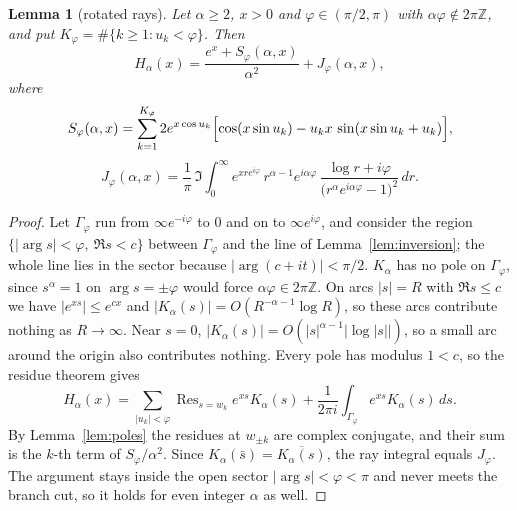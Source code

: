 \documentclass[11pt,a4paper]{article}
\theoremstyle{plain}
\newtheorem{lemma}[theorem]{Lemma}
\theoremstyle{remark}
\newcommand{\Z}{\mathbb Z}
\DeclareMathOperator{\Res}{Res}
\begin{document}
\begin{lemma}[rotated rays]\label{lem:rays}
Let $\alpha\ge2$, $x>0$ and $\varphi\in(\pi/2,\pi)$ with $\alpha\varphi\notin2\pi\Z$, and put
$K_\varphi=\#\{k\ge1:u_k<\varphi\}$. Then
\begin{equation}\label{eq:rays}
 H_\alpha(x)=\frac{e^x+S_\varphi(\alpha,x)}{\alpha^2}+J_\varphi(\alpha,x),
\end{equation}
where
\[
 S_\varphi(\alpha,x)=\sum_{k=1}^{K_\varphi}2e^{x\cos u_k}
 \Bigl[\cos(x\sin u_k)-u_kx\,\sin(x\sin u_k+u_k)\Bigr],
\]
\[
 J_\varphi(\alpha,x)=\frac1\pi\,\Im\int_0^\infty e^{xre^{i\varphi}}\,r^{\alpha-1}e^{i\alpha\varphi}\,
 \frac{\log r+i\varphi}{\bigl(r^\alpha e^{i\alpha\varphi}-1\bigr)^2}\,dr .
\]
\end{lemma}
\begin{proof}
Let $\Gamma_\varphi$ run from $\infty e^{-i\varphi}$ to $0$ and on to $\infty e^{i\varphi}$, and
consider the region $\{|\arg s|<\varphi,\ \Re s<c\}$ between $\Gamma_\varphi$ and the line of
Lemma~\ref{lem:inversion}; the whole line lies in the sector because $|\arg(c+it)|<\pi/2$.
$K_\alpha$ has no pole on $\Gamma_\varphi$, since $s^\alpha=1$ on $\arg s=\pm\varphi$ would force
$\alpha\varphi\in2\pi\Z$. On arcs $|s|=R$ with $\Re s\le c$ we have $|e^{xs}|\le e^{cx}$ and
$|K_\alpha(s)|=O(R^{-\alpha-1}\log R)$, so these arcs contribute nothing as $R\to\infty$. Near
$s=0$, $|K_\alpha(s)|=O(|s|^{\alpha-1}|\log|s||)$, so a small arc around the origin also
contributes nothing. Every pole has modulus $1<c$, so the residue theorem gives
\[
 H_\alpha(x)=\sum_{|u_k|<\varphi}\Res_{s=w_k}e^{xs}K_\alpha(s)
 +\frac1{2\pi i}\int_{\Gamma_\varphi}e^{xs}K_\alpha(s)\,ds .
\]
By Lemma~\ref{lem:poles} the residues at $w_{\pm k}$ are complex conjugate, and their sum is the
$k$-th term of $S_\varphi/\alpha^2$. Since $K_\alpha(\bar s)=\overline{K_\alpha(s)}$, the ray
integral equals $J_\varphi$. The argument stays inside the open sector $|\arg s|<\varphi<\pi$ and
never meets the branch cut, so it holds for even integer $\alpha$ as well.
\end{proof}
\end{document}
